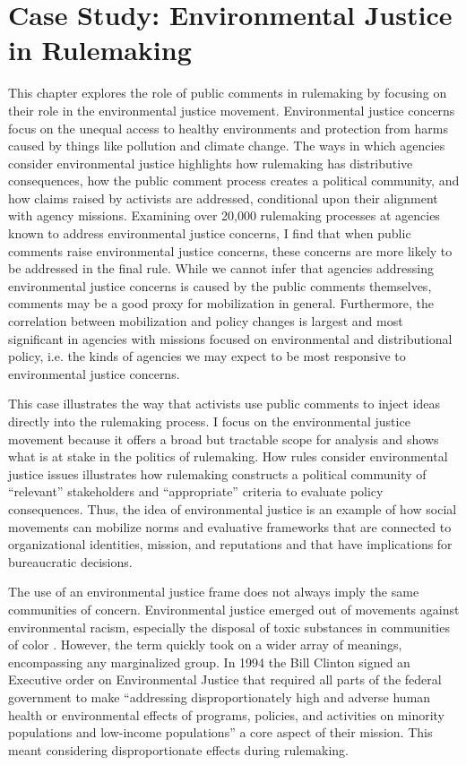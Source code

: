 \section{Case Study: Environmental Justice in Rulemaking} 
This chapter 
explores the role of public comments in rulemaking by focusing on their role in the environmental justice movement. Environmental justice concerns focus on the unequal access to healthy environments and protection from harms caused by things like pollution and climate change. The ways in which agencies consider environmental justice highlights how rulemaking has distributive consequences, how the public comment process creates a political community, and how claims raised by activists are addressed, conditional upon their alignment with agency missions. Examining over 20,000 rulemaking processes at agencies known to address environmental justice concerns, I find that when public comments raise environmental justice concerns, these concerns are more likely to be addressed in the final rule. While we cannot infer that agencies addressing environmental justice concerns is caused by the public comments themselves, comments may be a good proxy for mobilization in general. Furthermore, the correlation between mobilization and policy changes is largest and most significant in agencies with missions focused on environmental and distributional policy, i.e. the kinds of agencies we may expect to be most responsive to environmental justice concerns.

This case illustrates the way that activists use public comments to inject ideas directly into the rulemaking process. I focus on the environmental justice movement because it offers a broad but tractable scope for analysis and shows what is at stake in the politics of rulemaking.  How rules consider environmental justice issues illustrates how rulemaking constructs a political community of ``relevant'' stakeholders and ``appropriate'' criteria to evaluate policy consequences. Thus, the idea of environmental justice is an example of how social movements can mobilize norms and evaluative frameworks that are connected to organizational identities, mission, and reputations and that have implications for bureaucratic decisions. 

The use of an environmental justice frame does not always imply the same communities of concern. Environmental justice emerged out of movements against environmental racism, especially the disposal of toxic substances in communities of color \citep{Bullard1993ConfrontingGrassroots}. However, the term quickly took on a wider array of meanings, encompassing any marginalized group. In 1994 the Bill Clinton signed an Executive order on Environmental Justice that required all parts of the federal government to make ``addressing disproportionately high and adverse human health or environmental effects of programs, policies, and activities on minority populations and low-income populations'' a core aspect of their mission. This meant considering disproportionate effects during rulemaking.

